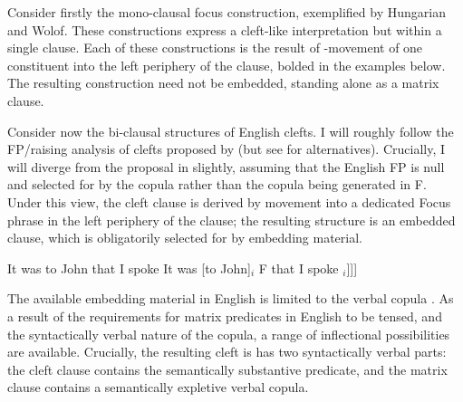 \documentclass[12pt]{article}
\begin{document}
Consider firstly the mono-clausal focus construction, exemplified by Hungarian and Wolof. These constructions express a cleft-like interpretation but within a single clause. Each of these constructions is the result of \abar{}-movement of one constituent into the left periphery of the clause, bolded in the examples below. The resulting construction need not be embedded, standing alone as a matrix clause. 

\bex
\ex {}
\bxl
{}
\ex[]{\lb{TopP} Mari \lb{FP} {\tbf{[egy kalapot]}$_{j}$} nézett$_{i}$ \lb{VP} \tit{t}$_{i}$ ki magának \tit{t}$_{j}$]]]}
\fxl
\ex {}
\bxl
{}
\ex[]{\lb{TopP} Man \lb{CP} \tbf{Yusu Nduur} la \lb{IP} a gis ]]]}
\fxl
\fex

Consider now the bi-clausal structures of English clefts. I will roughly follow the FP/raising analysis of clefts proposed by \citet{ekiss-1998} (but see \citealt{hedberg-2000} for alternatives). Crucially, I will diverge from the proposal in \citet{ekiss-1998} slightly, assuming that the English FP is null and selected for by the copula rather than the copula being generated in F. Under this view, the cleft clause is derived by movement into a dedicated Focus phrase in the left periphery of the clause; the resulting structure is an embedded clause, which is obligatorily selected for by embedding material.  

\bex
\ex {}
\bxl
\ex It was to John that I spoke
\ex {}It was  {[to John]$_{i}$} F  that  I spoke $_{i}$]]]
\fxl
\fex

The available embedding material in English is limited to the verbal copula . As a result of the requirements for matrix predicates in English to be tensed, and the syntactically verbal nature of the copula, a range of inflectional possibilities are available. Crucially, the resulting cleft is has two syntactically verbal parts: the cleft clause contains the semantically substantive predicate, and the matrix clause contains a semantically expletive verbal copula. 
\end{document}
